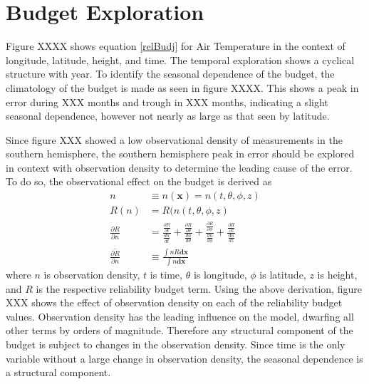 \documentclass[smallextended]{svjour3}       %
\begin{document}
\section{Budget Exploration}
Figure XXXX shows equation \ref{relBudj} for Air Temperature in the context of longitude, latitude, height, and time. The temporal exploration shows a cyclical structure with year. To identify the seasonal dependence of the budget, the climatology of the budget is made as seen in figure XXXX. This shows a peak in error during XXX months and trough in XXX months, indicating a slight seasonal dependence, however not nearly as large as that seen by latitude.

Since figure XXX showed a low observational density of measurements in the southern hemisphere, the southern hemisphere peak in error should be explored in context with observation density to determine the leading cause of the error. To do so, the observational effect on the budget is derived as
\begin{align}
    n &\equiv n(\mathbf{x}) = n(t, \theta, \phi, z)\nonumber\\
    R(n) &= R(n(t,\theta,\phi, z)\nonumber\\
    \frac{\partial R}{\partial n} &= \frac{\frac{\partial R}{\partial t}}{\frac{dn}{dt}} + \frac{\frac{\partial R}{\partial \theta}}{\frac{dn}{d\theta}} + \frac{\frac{\partial R}{\partial \phi}}{\frac{dn}{d\phi}} +\frac{\frac{\partial R}{\partial z}}{\frac{dn}{dz}}\label{partialT}\\
    \overline{\frac{\partial R}{\partial n}} &\equiv \frac{\int  n R\mathbf{dx}}{\int  n\mathbf{dx}}\nonumber
\end{align}
where $n$ is observation density, $t$ is time, $\theta$ is longitude, $\phi$ is latitude, $z$ is height, and $R$ is the respective reliability budget term. Using the above derivation, figure XXX shows the effect of observation density on each of the reliability budget values. Observation density has the leading influence on the model, dwarfing all other terms by orders of magnitude.  Therefore any structural component of the budget is subject to changes in the observation density. Since time is the only variable without a large change in observation density, the seasonal dependence is a structural component.
\end{document}
